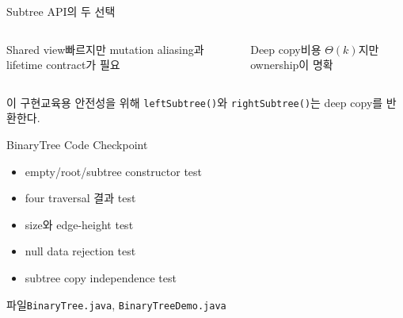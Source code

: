 \begin{frame}{Subtree API의 두 선택}
\begin{columns}[T]\begin{block}{Shared view}빠르지만 mutation aliasing과 lifetime contract가 필요\end{block}
\begin{block}{Deep copy}비용 $\Theta(k)$지만 ownership이 명확\end{block}\end{columns}
\begin{alertblock}{이 구현}교육용 안전성을 위해 \texttt{leftSubtree()}와 \texttt{rightSubtree()}는 deep copy를 반환한다.\end{alertblock}
\end{frame}
\begin{frame}{BinaryTree Code Checkpoint}
\begin{itemize}
\item empty/root/subtree constructor test
\item four traversal 결과 test
\item size와 edge-height test
\item null data rejection test
\item subtree copy independence test
\end{itemize}
\begin{block}{파일}\texttt{BinaryTree.java}, \texttt{BinaryTreeDemo.java}\end{block}
\end{frame}
